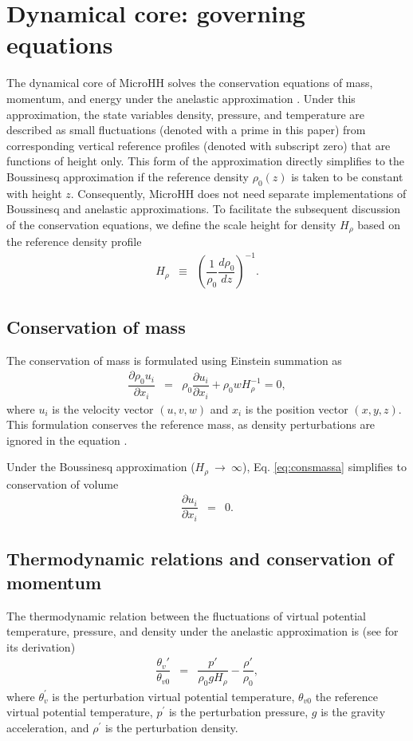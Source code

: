\documentclass[gmd,manuscript]{copernicus}
\begin{document}
\section{Dynamical core: governing equations}\label{sec:dyncore}
The dynamical core of MicroHH solves the conservation equations of mass, momentum, and energy under the anelastic approximation \citep{Bannon1996}. Under this approximation, the state variables density, pressure, and temperature are described as small fluctuations (denoted with a prime in this paper) from corresponding vertical reference profiles (denoted with subscript zero) that are functions of height only. This form of the approximation directly simplifies to the Boussinesq approximation if the reference density $\rho_0 (z)$ is taken to be constant with height $z$. Consequently, MicroHH does not need separate implementations of Boussinesq and anelastic approximations. To facilitate the subsequent discussion of the conservation equations, we define the scale height for density $H_\rho$ based on the reference density profile
\begin{eqnarray}
H_{\rho} & \equiv & \left( \dfrac{1}{\rho_0} \dfrac{d \rho_0}{dz} \right)^{-1}.
\end{eqnarray}

\subsection{Conservation of mass}
The conservation of mass is formulated using Einstein summation as
\begin{eqnarray}
\dfrac{\partial \rho_0 u_i}{\partial x_i} & = & \rho_0 \dfrac{\partial u_i}{\partial x_i} + \rho_0 w H_{\rho}^{-1} = 0, \label{eq:consmassa}
\end{eqnarray}
where $u_i$ is the velocity vector $(u,v,w)$ and $x_i$ is the position vector $(x,y,z)$. This formulation conserves the reference mass, as density perturbations are ignored in the equation \citep{Lilly1996}.

Under the Boussinesq approximation ($H_{\rho}~\rightarrow~\infty$), Eq. \ref{eq:consmassa} simplifies to conservation of volume
\begin{eqnarray}
\dfrac{\partial u_i}{\partial x_i} & = & 0. \label{eq:consmassb}
\end{eqnarray}

\subsection{Thermodynamic relations and conservation of momentum}
The thermodynamic relation between the fluctuations of virtual potential temperature, pressure, and density under the anelastic approximation is (see \citet{Bannon1996} for its derivation)
\begin{eqnarray}
\dfrac{\theta_v'}{\theta_{v0}} & = & \dfrac{p'}{\rho_0 g H_{\rho}} - \dfrac{\rho'}{\rho_0},\label{eq:statea}
\end{eqnarray}
where $\theta_v^\prime$ is the perturbation virtual potential temperature, $\theta_{v0}$ the reference virtual potential temperature, $p^\prime$ is the perturbation pressure, $g$ is the gravity acceleration, and $\rho^\prime$ is the perturbation density.
\end{document}
